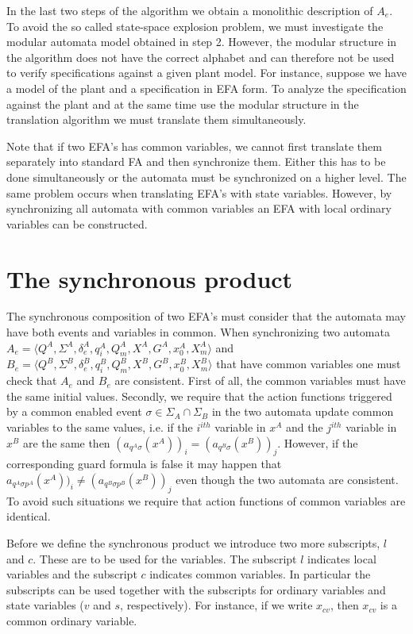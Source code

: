 \documentclass{article}
\begin{document}
In the last two steps  of the algorithm we obtain a monolithic description of $A_e$. To avoid the so called
 state-space explosion problem, we must investigate the modular automata model obtained in step 2. However,
 the modular structure in the algorithm does not have the correct alphabet and can therefore not be used to
 verify specifications against a given plant model. For instance, suppose we have a model of the plant and
 a specification in EFA form. To analyze the specification against the plant and at the same time
use the modular structure in the translation algorithm we must translate them simultaneously.

Note that if two EFA's has common variables, we cannot first translate them
separately into standard FA and then synchronize them. Either this
has to be done simultaneously or the automata must be synchronized
on a higher level. The same problem occurs when translating EFA's with
state variables. However, by synchronizing all automata with
common variables an EFA with local ordinary variables can be constructed.



\section{The synchronous product}

The synchronous composition of two EFA's must consider that the automata
may have both events and variables in common. When synchronizing two automata
$A_e=\langle Q^A, \Sigma^A, \delta^A_e, q^A_i, Q^A_m,
X^A, G^{A}, x^{A}_0, X^{A}_m \rangle$ and $B_e=\langle Q^B, \Sigma^B,
\delta^B_e, q^B_i, Q^B_m, X^B, G^{B}, x^{B}_0, X^{B}_m \rangle$ that have
common variables one must check that $A_e$ and $B_e$ are
consistent. First of all, the common variables must have the same
initial values. Secondly, we require that the action functions
triggered by a common enabled event $\sigma\in \Sigma_{A}\cap
\Sigma_{B}$ in the two automata update common variables to the
same values, i.e. if the $i^{ith}$ variable in $x^{A}$ and the
$j^{ith}$ variable in $x^{B}$ are the same then $(a_{q^A \sigma}(x^{A}))_i = (a_{q^B
\sigma}(x^{B}))_j$. However, if the corresponding guard
formula is false it may happen that $a_{q^A \sigma p^A}(x^{A}))_i \neq (a_{q^B
\sigma p^B}(x^{B}))_j$ even though the two automata are consistent.
To avoid such situations we require that action functions of common
variables are identical.

Before we define the synchronous product we introduce two more
subscripts, $l$ and $c$. These are to be used for the variables.
The subscript $l$ indicates local variables and the subscript $c$
indicates common variables. In particular the subscripts can be
used together with the subscripts for ordinary variables and state
variables ($v$  and $s$, respectively). For instance, if we write
$x_{cv}$, then $x_{cv}$ is a common ordinary variable.
\end{document}
